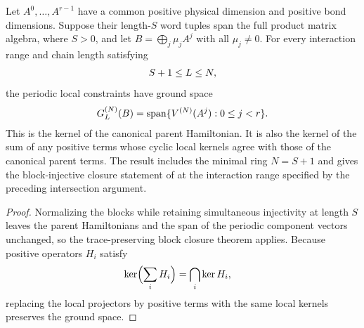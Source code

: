 \begin{lemma}
    \label{thm:ph_block_ground_space_at_simultaneous_injectivity}
    \leanok
    Let $A^0,\ldots,A^{r-1}$ have a common positive physical dimension and
    positive bond dimensions. Suppose their length-$S$ word tuples span the
    full product matrix algebra, where $S>0$, and let
    $B=\bigoplus_j\mu_j A^j$ with all $\mu_j\ne0$.
    For every interaction range and chain length satisfying
    \begin{align}
        S+1\leq L\leq N,
        \notag
    \end{align}
    the periodic local constraints have ground space
    \begin{align}
        G_L^{(N)}(B)
        =\operatorname{span}\{V^{(N)}(A^j):0\leq j<r\}.
        \notag
    \end{align}
    This is the kernel of the canonical parent Hamiltonian. It is also the
    kernel of the sum of any positive terms whose cyclic local kernels agree
    with those of the canonical parent terms.
    The result includes the minimal ring $N=S+1$ and gives the
    block-injective closure statement of \cite[Section~IV.C]{Cirac2021Matrix}
    at the interaction range specified by the preceding intersection argument.
\end{lemma}
\begin{proof}\leanok
    Normalizing the blocks while retaining simultaneous injectivity at length
    $S$ leaves the parent Hamiltonians and the span of the periodic component
    vectors unchanged, so the trace-preserving block closure theorem applies.
    Because positive operators $H_i$ satisfy
    \begin{align}
        \ker\Bigl(\sum_i H_i\Bigr) & =\bigcap_i\ker H_i,
        \notag
    \end{align}
    replacing the local projectors by positive terms with the same local
    kernels preserves the ground space.
\end{proof}

